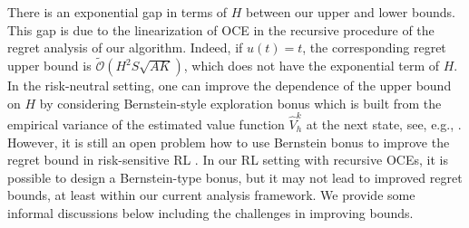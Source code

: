 \documentclass[11pt]{article}
\newcommand{\1}{\mathbbm{1}}
\begin{document}


 



There is an exponential gap in terms of $H$ between our upper and lower bounds. This gap is due to the linearization of OCE in the recursive procedure of the regret analysis of our algorithm. Indeed, if $u(t)=t$, the corresponding regret upper bound is $\tilde{\mathcal{O}}(H^2S\sqrt{AK})$, which does not have the exponential term of $H$. In the risk-neutral setting, one can improve the dependence of the upper bound on $H$ by considering Bernstein-style exploration bonus which is built from the empirical variance of the estimated value function $\hat V^k_h$ at the next state, see, e.g., \cite{azar2017minimax}. However, it is still an open problem how to use Bernstein bonus to improve the regret bound in risk-sensitive RL \citep{fei2021exponential, du2022risk}. In our RL setting with recursive OCEs, it is possible to design a Bernstein-type bonus, but it may not lead to improved regret bounds, at least within our current analysis framework. We provide some informal discussions below including the challenges in improving bounds.
\end{document}
